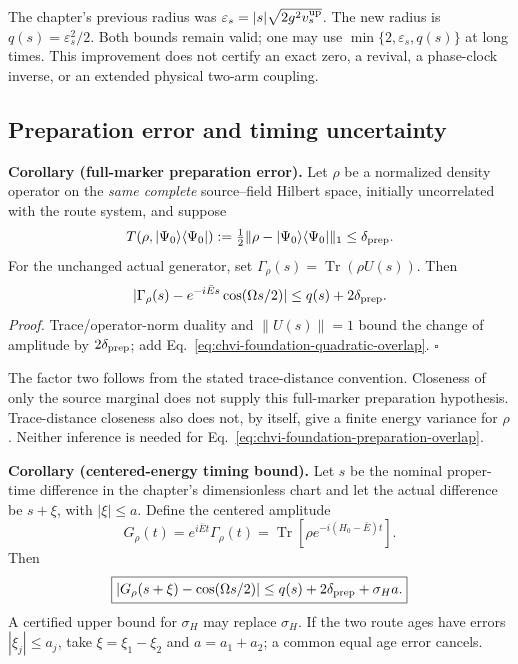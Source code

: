 The chapter's previous radius was
$\varepsilon_s=|s|\sqrt{2g^2v_s^{\rm up}}$.
The new radius is $q(s)=\varepsilon_s^2/2$. Both bounds remain valid;
one may use $\min\{2,\varepsilon_s,q(s)\}$ at long times. This improvement
does not certify an exact zero, a revival, a phase-clock inverse, or an
extended physical two-arm coupling.

\subsection{Preparation error and timing uncertainty}

\noindent\textbf{Corollary (full-marker preparation error).}
Let $\rho$ be a normalized density operator on the \emph{same complete}
source--field Hilbert space, initially uncorrelated with the route system,
and suppose
\begin{equation}
 T(\rho,|\Psi_0\rangle\langle\Psi_0|)
 :=\tfrac12\|\rho-|\Psi_0\rangle\langle\Psi_0|\|_1
 \leq\delta_{\rm prep}.
\end{equation}
For the unchanged actual generator, set
$\Gamma_\rho(s)=\operatorname{Tr}(\rho U(s))$. Then
\begin{equation}
 |\Gamma_\rho(s)-e^{-i\bar Es}\cos(\Omega s/2)|
 \leq q(s)+2\delta_{\rm prep}.
\label{eq:chvi-foundation-preparation-overlap}
\end{equation}
\emph{Proof.} Trace/operator-norm duality and $\|U(s)\|=1$ bound the
change of amplitude by $2\delta_{\rm prep}$; add
Eq.~\eqref{eq:chvi-foundation-quadratic-overlap}. $\square$

The factor two follows from the stated trace-distance convention.
Closeness of only the source marginal does not supply this full-marker
preparation hypothesis. Trace-distance closeness also does not, by
itself, give a finite energy variance for $\rho$. Neither inference is
needed for Eq.~\eqref{eq:chvi-foundation-preparation-overlap}.

\noindent\textbf{Corollary (centered-energy timing bound).}
Let $s$ be the nominal proper-time difference in the chapter's
dimensionless chart and let the actual difference be $s+\xi$, with
$|\xi|\leq a$. Define the centered amplitude
\begin{equation}
 G_\rho(t)=e^{i\bar Et}\Gamma_\rho(t)
          =\operatorname{Tr}[\rho e^{-i(H_0-\bar E)t}].
\end{equation}
Then
\begin{equation}
 \boxed{\begin{gathered}
 |G_\rho(s+\xi)-\cos(\Omega s/2)|
 \leq q(s)+2\delta_{\rm prep}+\sigma_H a.
 \end{gathered}}
\label{eq:chvi-foundation-centered-jitter}
\end{equation}
A certified upper bound for $\sigma_H$ may replace $\sigma_H$.
If the two route ages have errors $|\xi_j|\leq a_j$, take
$\xi=\xi_1-\xi_2$ and $a=a_1+a_2$; a common equal age error cancels.

